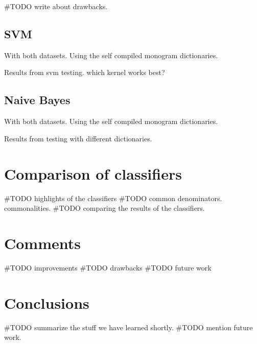 #TODO write about drawbacks. 

\subsection{SVM}
With both datasets.
Using the self compiled monogram dictionaries. 

Results from svm testing. which kernel works best?

\subsection{Naive Bayes}
With both datasets.
Using the self compiled monogram dictionaries. 

Results from testing with different dictionaries. 

\section{Comparison of classifiers}
#TODO highlights of the classifiers
#TODO common denominators. commonalities.   
#TODO comparing the results of the classifiers.  

\section{Comments}
#TODO improvements
#TODO drawbacks
#TODO future work

\section{Conclusions}
#TODO summarize the stuff we have learned shortly. 
#TODO mention future work. 
